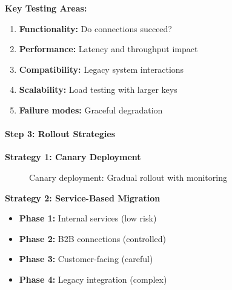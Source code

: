 \documentclass[11pt,a4paper]{article}
\begin{document}
\textbf{Key Testing Areas:}
\begin{enumerate}
    \item \textbf{Functionality:} Do connections succeed?
    \item \textbf{Performance:} Latency and throughput impact
    \item \textbf{Compatibility:} Legacy system interactions
    \item \textbf{Scalability:} Load testing with larger keys
    \item \textbf{Failure modes:} Graceful degradation
\end{enumerate}

\paragraph{Step 3: Rollout Strategies}

\textbf{Strategy 1: Canary Deployment}

\begin{figure}[h]
\centering
{}
\caption{Canary deployment: Gradual rollout with monitoring}
\end{figure}

\textbf{Strategy 2: Service-Based Migration}

\begin{itemize}
    \item \textbf{Phase 1:} Internal services (low risk)
    \item \textbf{Phase 2:} B2B connections (controlled)
    \item \textbf{Phase 3:} Customer-facing (careful)
    \item \textbf{Phase 4:} Legacy integration (complex)
\end{itemize}
\end{document}
